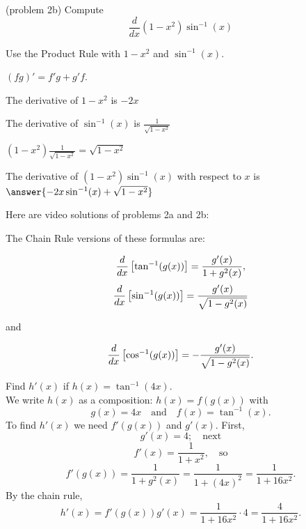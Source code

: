 \documentclass[handout]{ximera}
\begin{document}
\begin{problem}(problem 2b)
  Compute
  \[
  \frac{d}{dx} (1-x^2) \sin^{-1}(x)
  \]
  
    \begin{hint}
      Use the Product Rule with $1-x^2$ and $\sin^{-1}(x)$.
    \end{hint}
    \begin{hint}
      $(fg)' = f'g+g'f$.
    \end{hint}
    \begin{hint}
      The derivative of $1 - x^2$ is $-2x$
    \end{hint}
    \begin{hint}
      The derivative of $\sin^{-1}(x)$ is $\frac{1}{\sqrt{1-x^2}}$
    \end{hint}
		\begin{hint}
       $(1-x^2) \frac{1}{\sqrt{1-x^2}} = \sqrt{1-x^2}$
    \end{hint}
		The derivative of $(1-x^2)\sin^{-1}(x)$ with respect to $x$ is
		 $\answer{-2x \sin^{-1}(x) + \sqrt{1-x^2}}$
		
\end{problem}

Here are video solutions of problems 2a and 2b:
\begin{foldable}
\end{foldable}


The Chain Rule versions of these formulas are:


\[
 \frac{d}{\mathop{}\!d x} \left[\tan^{-1}(g(x))\right] = \frac{g'(x)}{1 + g^2(x)},
\]
\[
 \frac{d}{\mathop{}\!d x} \left[\sin^{-1}(g(x))\right] = \frac{g'(x)}{\sqrt{1 - g^2(x)}}
\]

and

\[
 \frac{d}{\mathop{}\!d x} \left[\cos^{-1}(g(x))\right] = -\frac{g'(x)}{\sqrt{1 - g^2(x)}}.
\]


\begin{example}[example 3]
Find $h'(x)$ if $h(x) = \tan^{-1}(4x)$.\\
We write $h(x)$ as a composition: $h(x)=f(g(x))$ with 
\[g(x) = 4x  \quad \text{and} \quad  f(x) = \tan^{-1}(x).\]
 To find $h'(x)$ we need $f'(g(x))$ and $g'(x)$.  First, 
\[g'(x) = 4; \quad \text{next} \] 
\[f'(x) = \frac{1}{1+x^2} , \quad \text{so}\]
\[ f'(g(x)) = \frac{1}{1+g^2(x)} =\frac{1}{1+(4x)^2}=\frac{1}{1+16x^2}.\]
By the chain rule,
\[h'(x) = f'(g(x))g'(x) = \frac{1}{1+16x^2} \cdot 4 = \frac{4}{1+16x^2}.\]
\end{example}

\begin{center}
\begin{foldable}
\end{foldable}
\end{center}
\end{document}
